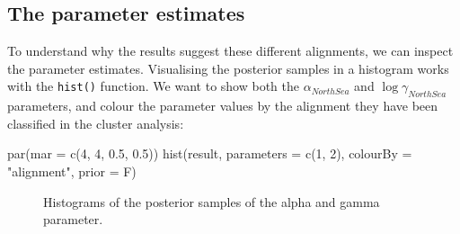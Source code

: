 \documentclass[
  letterpaper,
  DIV=11,
  numbers=noendperiod]{scrartcl}
\newenvironment{Shaded}{\begin{snugshade}}{\end{snugshade}}
\newcommand{\AttributeTok}[1]{\textcolor[rgb]{0.40,0.45,0.13}{#1}}
\newcommand{\DecValTok}[1]{\textcolor[rgb]{0.68,0.00,0.00}{#1}}
\newcommand{\FloatTok}[1]{\textcolor[rgb]{0.68,0.00,0.00}{#1}}
\newcommand{\FunctionTok}[1]{\textcolor[rgb]{0.28,0.35,0.67}{#1}}
\newcommand{\NormalTok}[1]{\textcolor[rgb]{0.00,0.23,0.31}{#1}}
\newcommand{\StringTok}[1]{\textcolor[rgb]{0.13,0.47,0.30}{#1}}
\begin{document}
\subsection{The parameter estimates}\label{the-parameter-estimates}

To understand why the results suggest these different alignments, we can
inspect the parameter estimates. Visualising the posterior samples in a
histogram works with the \texttt{hist()} function. We want to show both
the \(\alpha_{North Sea}\) and \(\log \gamma_{North Sea}\) parameters,
and colour the parameter values by the alignment they have been
classified in the cluster analysis:

\begin{Shaded}
\begin{Highlighting}[]
\FunctionTok{par}\NormalTok{(}\AttributeTok{mar =} \FunctionTok{c}\NormalTok{(}\DecValTok{4}\NormalTok{, }\DecValTok{4}\NormalTok{, }\FloatTok{0.5}\NormalTok{, }\FloatTok{0.5}\NormalTok{))}
\FunctionTok{hist}\NormalTok{(result, }\AttributeTok{parameters =} \FunctionTok{c}\NormalTok{(}\DecValTok{1}\NormalTok{, }\DecValTok{2}\NormalTok{), }\AttributeTok{colourBy =} \StringTok{"alignment"}\NormalTok{, }\AttributeTok{prior =}\NormalTok{ F)}
\end{Highlighting}
\end{Shaded}

\begin{figure}[H]


\caption{\label{fig-8}Histograms of the posterior samples of the alpha
and gamma parameter.}

\end{figure}%
\end{document}

